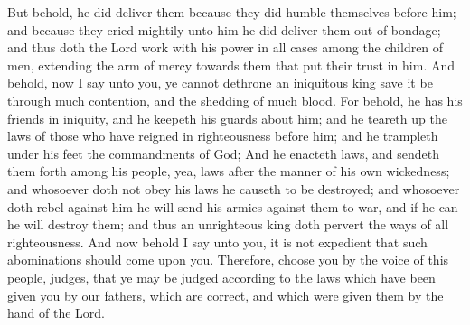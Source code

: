 But behold, he did deliver them because they did humble themselves before him; and because they cried mightily unto him he did deliver them out of bondage; and thus doth the Lord work with his power in all cases among the children of men, extending the arm of mercy towards them that put their trust in him.
\bverse \iffalse And behold, now I say unto you, ye cannot dethrone an iniquitous king save it be through much contention, and the shedding of much blood. \fi
And behold, now I say unto you, ye cannot dethrone an iniquitous king save it be through much contention, and the shedding of much blood.
\bverse \iffalse For behold, he has his friends in iniquity, and he keepeth his guards about him; and he teareth up the laws of those who have reigned in righteousness before him; and he trampleth under his feet the commandments of God; \fi
For behold, he has his friends in iniquity, and he keepeth his guards about him; and he teareth up the laws of those who have reigned in righteousness before him; and he trampleth under his feet the commandments of God;
\bverse \iffalse And he enacteth laws, and sendeth them forth among his people, yea, laws after the manner of his own wickedness; and whosoever doth not obey his laws he causeth to be destroyed; and whosoever doth rebel against him he will send his armies against them to war, and if he can he will destroy them; and thus an unrighteous king doth pervert the ways of all righteousness. \fi
And he enacteth laws, and sendeth them forth among his people, yea, laws after the manner of his own wickedness; and whosoever doth not obey his laws he causeth to be destroyed; and whosoever doth rebel against him he will send his armies against them to war, and if he can he will destroy them; and thus an unrighteous king doth pervert the ways of all righteousness.
\bverse \iffalse And now behold I say unto you, it is not expedient that such abominations should come upon you. \fi
And now behold I say unto you, it is not expedient that such abominations should come upon you.
\bverse \iffalse Therefore, choose you by the voice of this people, judges, that ye may be judged according to the laws which have been given you by our fathers, which are correct, and which were given them by the hand of the Lord. \fi
Therefore, choose you by the voice of this people, judges, that ye may be judged according to the laws which have been given you by our fathers, which are correct, and which were given them by the hand of the Lord.
\bverse \iffalse Now it is not common that the voice of the people desireth anything contrary to that which is right; but it is common for the lesser part of the people to desire that which is not right; therefore this shall ye observe and make it your law--to do your business by the voice of the people. \fi
